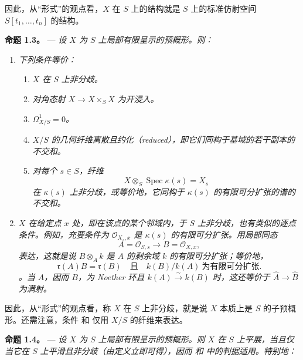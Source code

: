 因此，从“形式”的观点看，\(X\) 在 \(S\) 上的结构就是 \(S\) 上的标准仿射空间 \(S[t_1,\ldots,t_n]\) 的结构。

\medskip\noindent{}\textbf{命题 1.3。} --- \textit{设 \(X\) 为 \(S\) 上局部有限呈示的预概形。则：}

\begin{enumerate}\item[(i)]\textit{下列条件等价：}\begin{enumerate}\item[(a)]\textit{\(X\) 在 \(S\) 上非分歧。}\item[(b)]\textit{对角态射 \(X\to X\times_S X\) 为开浸入。}\item[(c)]\textit{\(\Omega^1_{X/S}=0\)。}\item[(d)]\textit{\(X/S\) 的几何纤维离散且约化（reduced），即它们同构于基域的若干副本的不交和。}\item[(e)]\textit{对每个 \(s\in S\)，纤维 \[
    X\otimes_S\operatorname{Spec}\kappa(s)=X_s
  \] 在 \(\kappa(s)\) 上非分歧，或等价地，它同构于 \(\kappa(s)\) 的有限可分扩张的谱的不交和。}\end{enumerate}

\item[(ii)]\textit{\(X\) 在给定点 \(x\) 处，即在该点的某个邻域内，于 \(S\) 上非分歧，也有类似的逐点条件。例如，充要条件为 \(\mathscr O_{X_s,x}\) 是 \(\kappa(s)\) 的有限可分扩张。用局部同态 \[
  A=\mathscr O_{S,s}\longrightarrow B=\mathscr O_{X,x},
\] 表达，这就是说 \(B\otimes_A k\) 是 \(A\) 的剩余域 \(k\) 的有限可分扩张；等价地，\[
  \mathfrak r(A)B=\mathfrak r(B)
  \quad\text{且}\quad
  k(B)/k(A)\ \text{为有限可分扩张}.
\]。当 \(A\)，因而 \(B\)，为 Noether 环且 \(k(A)\xrightarrow{\sim}k(B)\) 时，这还等价于 \(\widehat A\to\widehat B\) 为满射。}\end{enumerate}

因此，从“形式”的观点看，称 \(X\) 在 \(S\) 上非分歧，就是说 \(X\) 本质上是 \(S\) 的子预概形。还需注意，条件  和  仅用 \(X/S\) 的纤维来表达。

\medskip\noindent{}\textbf{命题 1.4。} --- \textit{设 \(X\) 为 \(S\) 上局部有限呈示的预概形。则 \(X\) 在 \(S\) 上平展，当且仅当它在 \(S\) 上平滑且非分歧（由定义立即可得），因而  和  中的判据适用。特别地：}

